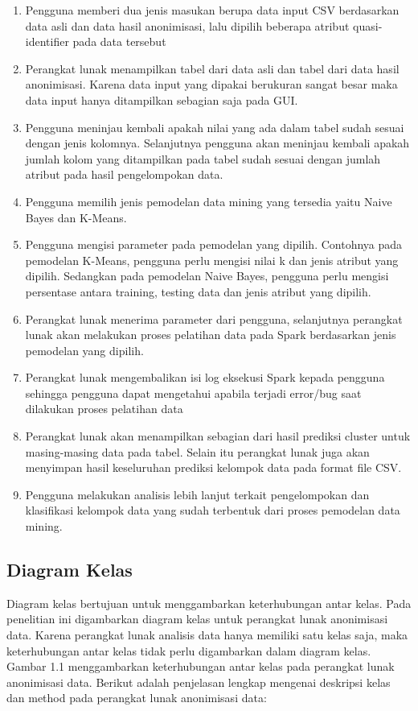 \begin{enumerate}

\item Pengguna memberi dua jenis masukan berupa data input CSV berdasarkan data asli dan data hasil anonimisasi, lalu dipilih beberapa atribut quasi-identifier pada data tersebut

\item Perangkat lunak menampilkan tabel dari data asli dan tabel dari data hasil anonimisasi. Karena data input yang dipakai berukuran sangat besar maka data input hanya ditampilkan sebagian saja pada GUI.

\item Pengguna meninjau kembali apakah nilai yang ada dalam tabel sudah sesuai dengan jenis kolomnya. Selanjutnya pengguna akan meninjau kembali apakah jumlah kolom yang ditampilkan pada tabel sudah sesuai dengan jumlah atribut pada hasil pengelompokan data.

\item Pengguna memilih jenis pemodelan data mining yang tersedia yaitu Naive Bayes dan K-Means. 

\item Pengguna mengisi parameter pada pemodelan yang dipilih. Contohnya pada pemodelan K-Means, pengguna perlu mengisi nilai k dan jenis atribut yang dipilih. Sedangkan pada pemodelan Naive Bayes, pengguna perlu mengisi persentase antara training, testing data dan jenis atribut yang dipilih.

\item Perangkat lunak menerima parameter dari pengguna, selanjutnya perangkat lunak akan melakukan proses pelatihan data pada Spark berdasarkan jenis pemodelan yang dipilih.

\item Perangkat lunak mengembalikan isi log eksekusi Spark kepada pengguna sehingga pengguna dapat mengetahui apabila terjadi error/bug saat dilakukan proses pelatihan data

\item Perangkat lunak akan menampilkan sebagian dari hasil prediksi cluster untuk masing-masing data pada tabel. Selain itu perangkat lunak juga akan menyimpan hasil keseluruhan prediksi kelompok data pada format file CSV.

\item Pengguna melakukan analisis lebih lanjut terkait pengelompokan dan klasifikasi kelompok data yang sudah terbentuk dari proses pemodelan data mining.
\end{enumerate}

\subsection{Diagram Kelas}
Diagram kelas bertujuan untuk menggambarkan keterhubungan antar kelas. Pada penelitian ini digambarkan diagram kelas untuk perangkat lunak anonimisasi data. Karena perangkat lunak analisis data hanya memiliki satu kelas saja, maka keterhubungan antar kelas tidak perlu digambarkan dalam diagram kelas. Gambar 1.1 menggambarkan keterhubungan antar kelas pada perangkat lunak anonimisasi data. Berikut adalah penjelasan lengkap mengenai deskripsi kelas dan method pada perangkat lunak anonimisasi data: